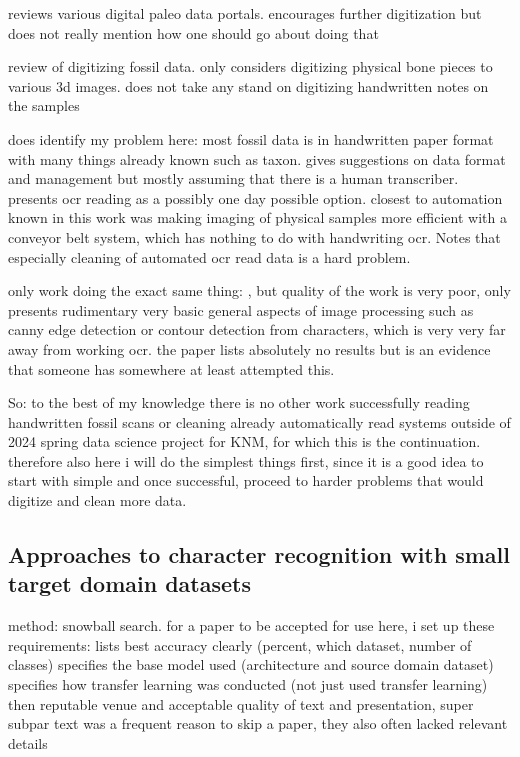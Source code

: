 \documentclass{article}
\begin{document}
\cite{uhenCardCatalogsComputers2013} reviews various digital paleo data portals. encourages further digitization but 
does not really mention how one should go about doing that

\cite{mallisonDigitizingMethodsPaleontology2011} review of digitizing fossil data. only considers digitizing 
physical bone pieces to various 3d images. does not take any stand on digitizing handwritten notes on the samples 

\cite{groomImprovedStandardizationTranscribed2019} does identify my problem here: most fossil data is in handwritten paper 
format with many things already known such as taxon. gives suggestions on data format and management but mostly assuming 
that there is a human transcriber. presents ocr reading as a possibly one day possible option. closest to automation 
known in this work was making imaging of physical samples more efficient with a conveyor belt system, which has nothing to 
do with handwriting ocr. Notes that especially cleaning of automated ocr read data is a hard problem.

only work doing the exact same thing: \cite{shanmugavelHandwrittenOpticalCharacter2018}, but quality of the work is very poor, only 
presents rudimentary very basic general aspects of image processing such as canny edge detection or contour detection from characters, 
which is very very far away from working ocr. the paper lists absolutely no results but is an evidence that someone has somewhere at least 
attempted this.

So: to the best of my knowledge there is no other work successfully reading handwritten fossil scans or cleaning 
already automatically read systems outside of 2024 spring data science project for KNM, for which this is the 
continuation. therefore also here i will do the simplest things first, since it is a good idea to start with simple and 
once successful, proceed to harder problems that would digitize and clean more data.

\subsection{Approaches to character recognition with small target domain datasets}

method: snowball search. for a paper to be accepted for use here, i set up these requirements:
lists best accuracy clearly (percent, which dataset, number of classes)
specifies the base model used (architecture and source domain dataset)
specifies how transfer learning was conducted (not just used transfer learning)
then reputable venue and acceptable quality of text and presentation, super subpar text was a frequent reason to skip a paper, they also often lacked relevant details
\end{document}
